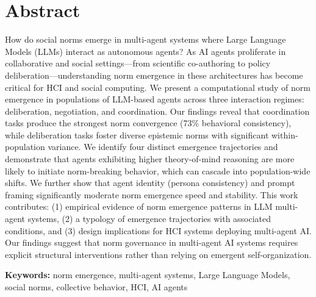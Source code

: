 \chapter*{Abstract}

How do social norms emerge in multi-agent systems where Large Language Models (LLMs) interact as autonomous agents? As AI agents proliferate in collaborative and social settings—from scientific co-authoring to policy deliberation—understanding norm emergence in these architectures has become critical for HCI and social computing. We present a computational study of norm emergence in populations of LLM-based agents across three interaction regimes: deliberation, negotiation, and coordination. Our findings reveal that coordination tasks produce the strongest norm convergence (73\% behavioral consistency), while deliberation tasks foster diverse epistemic norms with significant within-population variance. We identify four distinct emergence trajectories and demonstrate that agents exhibiting higher theory-of-mind reasoning are more likely to initiate norm-breaking behavior, which can cascade into population-wide shifts. We further show that agent identity (persona consistency) and prompt framing significantly moderate norm emergence speed and stability. This work contributes: (1) empirical evidence of norm emergence patterns in LLM multi-agent systems, (2) a typology of emergence trajectories with associated conditions, and (3) design implications for HCI systems deploying multi-agent AI. Our findings suggest that norm governance in multi-agent AI systems requires explicit structural interventions rather than relying on emergent self-organization.

\textbf{Keywords:} norm emergence, multi-agent systems, Large Language Models, social norms, collective behavior, HCI, AI agents